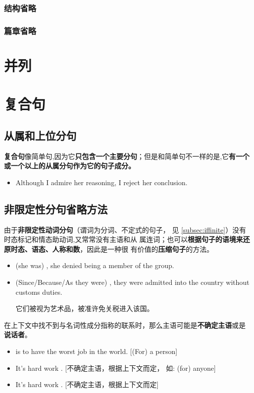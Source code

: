 \subsubsection{结构省略}
\subsubsection{篇章省略}


\section{并列}

\section{复合句}

\subsection{从属和上位分句}

\textbf{复合句}像简单句,因为它\textbf{只包含一个主要分句}；但是和简单句不一样的是,它\textbf{有一个
或一个以上的从属分句作为它的句子成分。}

\begin{itemize}
\item Although I admire her reasoning, I reject her conclusion.
\end{itemize}

\subsection{非限定性分句省略方法}


由于\textbf{非限定性动词分句}（谓词为分词、不定式的句子，
见 \cref{subsec:iffinite}）没有时态标记和情态助动词,又常常没有主语和从
属连词；也可以\textbf{根据句子的语境来还原时态、语态、人称和数}，因此是一种很
有价值的\textbf{压缩句子}的方法。

\begin{itemize}
\item {} (she was) , she denied being a member of the group.
\item (Since/Because/As they were) , they were
  admitted into the country without customs duties.

  它们被视为艺术品，被准许免关税进入该国。
\end{itemize}

在上下文中找不到与名词性成分指称的联系时，那么主语可能是\textbf{不确定主语}或是
\textbf{说话者}。
\begin{itemize}
\item {} is to have the worst job in the
  world. [(For) a person]
\item It's hard work . [不确定主语，根据上下文而定，
  如: (for) anyone]
\item It's hard work . [不确定主语，根据上下文而定]
\end{itemize}

